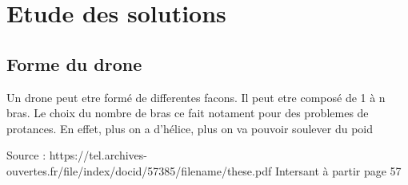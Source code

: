 \documentclass{article}
\begin{document}
\begin{landscape}
\begin{ganttchart}
% 
% 
% 

\end{ganttchart}

\end{landscape}
\section{Etude des solutions}
\subsection{Forme du drone}
Un drone peut etre formé de differentes facons. Il peut etre composé de 1 à n bras. Le choix du nombre de bras ce fait notament pour des problemes de protances. En effet, plus on a d'hélice, plus on va pouvoir soulever du poid 

Source : https://tel.archives-ouvertes.fr/file/index/docid/57385/filename/these.pdf Intersant à partir page 57
\end{document}
